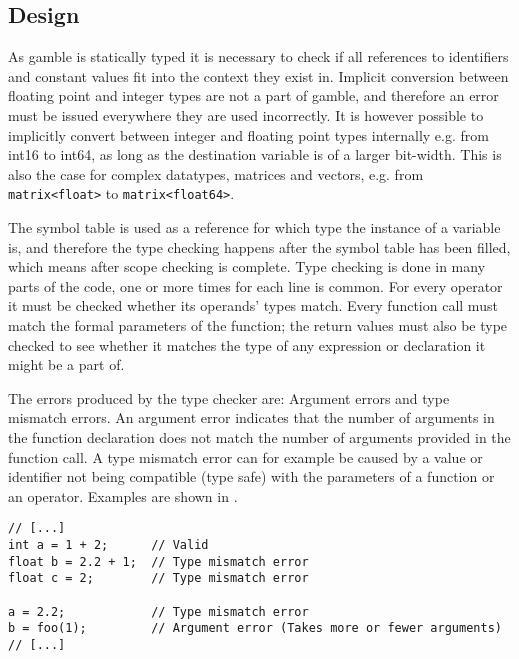 \subsection*{Design}
As \gls{gamble} is statically typed it is necessary to check if all references to identifiers and constant values fit into the context they exist in. 
Implicit conversion between floating point and integer types are not a part of \gls{gamble}, and therefore an error must be issued everywhere they are used incorrectly. 
It is however possible to implicitly convert between integer and floating point types internally e.g. from int16 to int64, as long as the destination variable is of a larger bit-width. 
This is also the case for complex datatypes, matrices and vectors, e.g. from \texttt{matrix<float>} to \texttt{matrix<float64>}.

The symbol table is used as a reference for which type the instance of a variable is, and therefore the type checking happens after the symbol table has been filled, which means after scope checking is complete. 
Type checking is done in many parts of the code, one or more times for each line is common. 
For every operator it must be checked whether its operands' types match. 
Every function call must match the formal parameters of the function; the return values must also be type checked to see whether it matches the type of any expression or declaration it might be a part of.

The errors produced by the type checker are: Argument errors and type mismatch errors.
An argument error indicates that the number of arguments in the function declaration does not match the number of arguments provided in the function call.
A type mismatch error can for example be caused by a value or identifier not being compatible (type safe) with the parameters of a function or an operator.
Examples are shown in .

\begin{lstlisting}[caption=Examples of type errors in \gls{gamble},numbers=none,frame=tlrb,label={lst:typeErrors}]
// [...]
int a = 1 + 2;      // Valid
float b = 2.2 + 1;  // Type mismatch error
float c = 2;        // Type mismatch error

a = 2.2;            // Type mismatch error
b = foo(1);         // Argument error (Takes more or fewer arguments) 
// [...]
\end{lstlisting}

